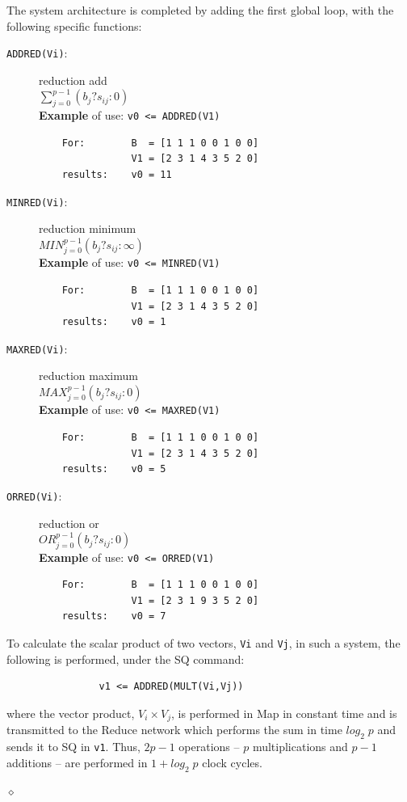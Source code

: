 The system architecture is completed by adding the first global loop, with the following specific functions:
    \begin{description}
        \item[{\tt ADDRED(Vi)}:] reduction add \\
        $\sum_{j=0}^{p-1} (b_j ? s_{ij} : 0)$ \\
         {\bf Example} of use: {\tt v0 <= ADDRED(V1)} 
    \begin{verbatim}
    For:        B  = [1 1 1 0 0 1 0 0]
                V1 = [2 3 1 4 3 5 2 0]
    results:    v0 = 11
    \end{verbatim}
        \item[{\tt MINRED(Vi)}:] reduction minimum \\
        $MIN_{j=0}^{p-1}  (b_j ? s_{ij} : \infty)$ \\
        {\bf Example} of use: {\tt v0 <= MINRED(V1)} 
    \begin{verbatim}
    For:        B  = [1 1 1 0 0 1 0 0]
                V1 = [2 3 1 4 3 5 2 0]
    results:    v0 = 1
         \end{verbatim}
        \item[{\tt MAXRED(Vi)}:] reduction maximum\\
        $MAX_{j=0}^{p-1} (b_j ? s_{ij} : 0)$ \\
         {\bf Example} of use: {\tt v0 <= MAXRED(V1)} 
    \begin{verbatim}
    For:        B  = [1 1 1 0 0 1 0 0]
                V1 = [2 3 1 4 3 5 2 0]
    results:    v0 = 5
         \end{verbatim}
        \item[{\tt ORRED(Vi)}:] reduction or\\
        $OR_{j=0}^{p-1} (b_j ? s_{ij} : 0)$ \\
         {\bf Example} of use: {\tt v0 <= ORRED(V1)} 
    \begin{verbatim}
    For:        B  = [1 1 1 0 0 1 0 0]
                V1 = [2 3 1 9 3 5 2 0]
    results:    v0 = 7
         \end{verbatim}
\end{description}

\begin{exemplu}
To calculate the scalar product of two vectors, {\tt Vi} and {\tt Vj}, in such a system, the following is performed, under the SQ command:
\begin{verbatim} 
                v1 <= ADDRED(MULT(Vi,Vj))  
\end{verbatim}
where the vector product, $V_i \times V_j$, is performed in Map in constant time and is transmitted to the Reduce network which performs the sum in time $log_2 \; p$ and sends it to SQ in {\tt v1}. Thus, $2p-1$ operations -- $p$ multiplications and $p-1$ additions -- are performed in $1 + log_2 \; p$ clock cycles. 

$\diamond$
\end{exemplu}

